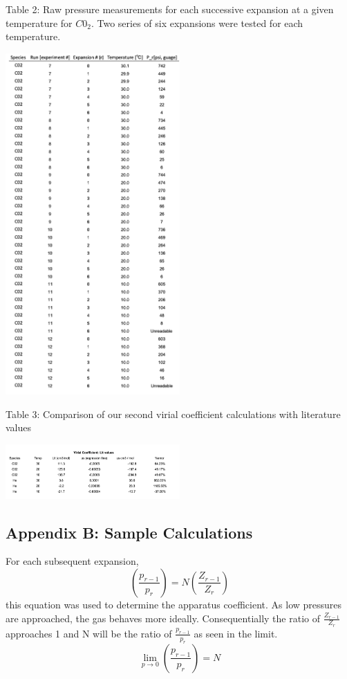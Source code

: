 \documentclass{article}
\begin{document}
\newpage \caption{\label{fig1}Table 2: Raw pressure measurements for each successive expansion at a given temperature for $C0_2$. Two series of six expansions were tested for each temperature.}
\centering\includegraphics[width=0.5\textwidth]{images/table_1.png}\raggedright

\caption{\label{fig1}Table 3: Comparison of our second virial coefficient calculations with literature values}
\centering\includegraphics[width=0.5\textwidth]{images/b_error.png}\raggedright


\newpage \begin{centering} \section*{Appendix B: Sample Calculations} \end{centering}

For each subsequent expansion,
\begin{equation} \label{eq:1} 
\left(\frac{p_{r-1}}{p_{r}}\right) = N\left(\frac{Z_{r-1}}{Z_{r}} \right)
\end{equation}
this equation was used to determine the apparatus coefficient. As low pressures are approached, the gas behaves more ideally. Consequentially the ratio of $\frac{Z_{r-1}}{Z_{r}}$ approaches 1 and N will be the ratio of $\frac{p_{r-1}}{p_{r}}$ as seen in the limit.
\begin{equation} \label{eq:1} 
\lim_{p\to0} \left(\frac{p_{r-1}}{p_{r}}\right) = N
\end{equation}
\end{document}
